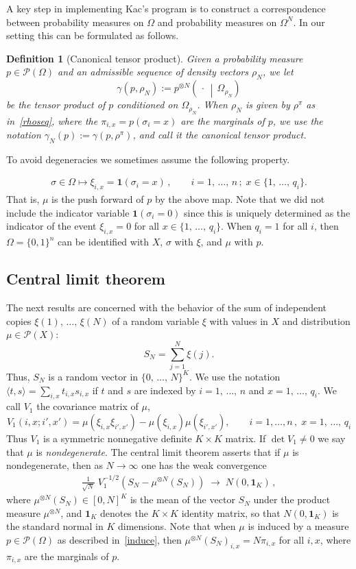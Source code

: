 \documentclass[10pt,a4paper]{article}
\newtheorem{defi}[theorem]{Definition}
\newcommand{\Om}{\Omega}
\newcommand{\rhoN}{\rho^{\pi}}
\newcommand{\si}{\sigma}
\newcommand{\scalar}[2]{\langle #1, #2\rangle}
\newcommand{\ind}{\mathbf{1}}
\newcommand{\cP}{\mathcal{P}}
\let\g=\gamma
\let\r=\rho
\let\O=\Omega
\begin{document}
A key step in implementing Kac's program is to construct a correspondence between probability measures on $\O$ and probability measures on $\O^N$. In our setting this can be formulated as follows.

\begin{defi}[Canonical tensor product]\label{def:canonical}
Given a probability measure $p \in \cP(\Om)$ and an admissible sequence of density vectors $\r_N$, we let
\[
\gamma(p,\r_N):=p^{\otimes N}\left(\,\cdot\,\middle|\,\Om_{\r_N}\right)
\]
be the tensor product of $p$ conditioned on $\Om_{\r_N}$. When $\r_N$ is given by $\rhoN$ as in~\eqref{rhoseq}, where the $\pi_{i,x}=p(\si_i=x)$ are the marginals of $p$, we use the notation $\g_N(p):= \gamma(p,\rhoN)$, and call it the \emph{canonical tensor product}.
\end{defi}

To avoid degeneracies we sometimes assume the following property.

\begin{align}\label{induce}
\si\in\O \mapsto \xi_{i,x} = \ind(\si_i=x)\,,\qquad i=1,\,\dots,\,n\,;\; x\in \{1,\,\dots,\,q_i\}.
\end{align}
That is, $\mu$ is the push forward of $p$ by the above map. Note that we did not include the indicator variable $ \ind(\si_i=0)$ since this is uniquely determined as the indicator of the event $\xi_{i,x}=0$ for all $x\in \{1,\,\dots,\,q_i\}$. When $q_i=1$ for all $i$, then $\O=\{0,1\}^n$ can be identified with $X$, $\si$ with $\xi$, and $\mu$ with $p$.


\subsection{Central limit theorem}

The next results are concerned with the behavior of the sum of independent copies $\xi(1),\,\dots,\,\xi(N)$ of a random variable $\xi$ with values in $X$ and distribution $\mu\in\cP(X)$:
\[
S_N = \sum_{j=1}^N\xi(j).
\]
Thus, $S_N$ is a random vector in $\{0,\,\dots,\,N\}^K$. We use the notation $\scalar{t}{s}=\sum_{i,x}t_{i,x}s_{i,x}$ if $t$ and $s$ are indexed by $i=1,\,\dots,\,n$ and $x=1,\,\dots,\,q_i$. We call $V_1$ the covariance matrix of $\mu$,
\[
V_1(i,x;i',x')=\mu(\xi_{i,x}\xi_{i',x'})-\mu(\xi_{i,x})\mu(\xi_{i',x'}),\qquad i=1,\dots,n\,,\; x=1,\,\dots,\,q_i
\]
Thus $V_1$ is a symmetric nonnegative definite $K\times K$ matrix. If $\det V_1\neq 0$ we say that $\mu$ is \emph{nondegenerate}. The central limit theorem asserts that if $\mu $ is nondegenerate, then as $N\to\infty$ one has the weak convergence
\begin{align}\label{eq:CLT}
\frac1{\sqrt N} \;V_1^{-1/2}\left(S_N - \mu^{\otimes N}(S_N)\right)\;
\longrightarrow\; N(0,\ind_K)\,,
\end{align}
where $\mu^{\otimes N}(S_N)\in[0,N]^K$ is the mean of the vector $S_N$ under the product measure $\mu^{\otimes N}$, and $\ind_K$ denotes the $K\times K$ identity matrix, so that $N(0,\ind_K)$ is the standard normal in $K$ dimensions. Note that when $\mu$ is induced by a measure $p\in\cP(\O)$ as described in~\eqref{induce}, then $\mu^{\otimes N}(S_N)_{i,x}=N\pi_{i,x}$ for all $i,x$, where $\pi_{i,x}$ are the marginals of $p$.
\end{document}
